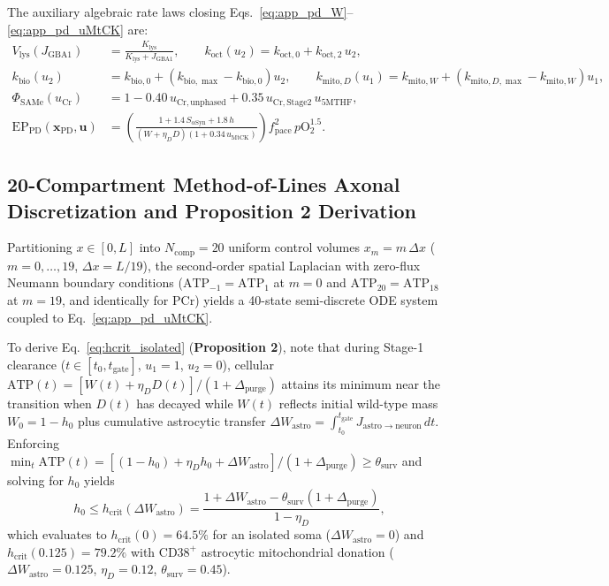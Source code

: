 \documentclass[11pt]{article}
\theoremstyle{plain}
\begin{document}
The auxiliary algebraic rate laws closing Eqs.~\eqref{eq:app_pd_W}--\eqref{eq:app_pd_uMtCK} are:
\begin{align}
  V_{\mathrm{lys}}(J_{\mathrm{GBA1}}) &= \frac{K_{\mathrm{lys}}}{K_{\mathrm{lys}} + J_{\mathrm{GBA1}}}, \qquad k_{\mathrm{oct}}(u_2) = k_{\mathrm{oct},0} + k_{\mathrm{oct},2}\,u_2, \label{eq:app_pd_Vlys}\\
  k_{\mathrm{bio}}(u_2) &= k_{\mathrm{bio},0} + \left(k_{\mathrm{bio,\max}} - k_{\mathrm{bio},0}\right)u_2, \qquad k_{\mathrm{mito},D}(u_1) = k_{\mathrm{mito},W} + \left(k_{\mathrm{mito},D,\max} - k_{\mathrm{mito},W}\right)u_1, \label{eq:app_pd_kbio}\\
  \Phi_{\mathrm{SAMe}}(u_{\mathrm{Cr}}) &= 1 - 0.40\,u_{\mathrm{Cr,unphased}} + 0.35\,u_{\mathrm{Cr,Stage2}}\,u_{\mathrm{5MTHF}}, \label{eq:app_pd_SAMe}\\
  \mathrm{EP}_{\mathrm{PD}}(\mathbf{x}_{\mathrm{PD}},\mathbf{u}) &= \left(\frac{1 + 1.4\,S_{\alpha\mathrm{Syn}} + 1.8\,h}{(W + \eta_D D)\left(1 + 0.34\,u_{\mathrm{MtCK}}\right)}\right) f_{\mathrm{pace}}^2\, p\mathrm{O}_2^{1.5}. \label{eq:app_pd_EP}
\end{align}

\subsection{20-Compartment Method-of-Lines Axonal Discretization and Proposition 2 Derivation}
\label{app:pd_pde}
\label{app:prop2_proof}
Partitioning $x \in [0, L]$ into $N_{\mathrm{comp}} = 20$ uniform control volumes $x_m = m\,\Delta x$ ($m = 0,\dots,19$, $\Delta x = L / 19$), the second-order spatial Laplacian with zero-flux Neumann boundary conditions ($\mathrm{ATP}_{-1} = \mathrm{ATP}_1$ at $m=0$ and $\mathrm{ATP}_{20} = \mathrm{ATP}_{18}$ at $m=19$, and identically for $\mathrm{PCr}$) yields a 40-state semi-discrete ODE system coupled to Eq.~\eqref{eq:app_pd_uMtCK}.

To derive Eq.~\eqref{eq:hcrit_isolated} (\textbf{Proposition 2}), note that during Stage-1 clearance ($t \in [t_0, t_{\mathrm{gate}}]$, $u_1 = 1$, $u_2 = 0$), cellular $\mathrm{ATP}(t) = [W(t) + \eta_D D(t)] / (1 + \Delta_{\mathrm{purge}})$ attains its minimum near the transition when $D(t)$ has decayed while $W(t)$ reflects initial wild-type mass $W_0 = 1 - h_0$ plus cumulative astrocytic transfer $\Delta W_{\mathrm{astro}} = \int_{t_0}^{t_{\mathrm{gate}}} J_{\mathrm{astro}\to\mathrm{neuron}}\,dt$. Enforcing $\min_{t} \mathrm{ATP}(t) = [(1 - h_0) + \eta_D h_0 + \Delta W_{\mathrm{astro}}] / (1 + \Delta_{\mathrm{purge}}) \ge \theta_{\mathrm{surv}}$ and solving for $h_0$ yields
\begin{equation}
  h_0 \le h_{\mathrm{crit}}(\Delta W_{\mathrm{astro}}) = \frac{1 + \Delta W_{\mathrm{astro}} - \theta_{\mathrm{surv}}(1 + \Delta_{\mathrm{purge}})}{1 - \eta_D},
  \label{eq:app_hcrit_general}
\end{equation}
which evaluates to $h_{\mathrm{crit}}(0) = 64.5\%$ for an isolated soma ($\Delta W_{\mathrm{astro}} = 0$) and $h_{\mathrm{crit}}(0.125) = 79.2\%$ with $\mathrm{CD38}^+$ astrocytic mitochondrial donation ($\Delta W_{\mathrm{astro}} = 0.125$, $\eta_D = 0.12$, $\theta_{\mathrm{surv}} = 0.45$).
\end{document}
